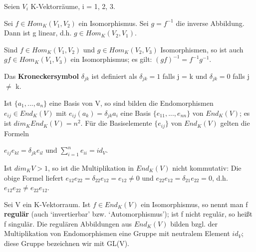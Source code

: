\begin{lemma}
Seien $V_i$ K-Vektorräume, i = 1, 2, 3.
\begin{compactenum}
\item Sei $f \in Hom_K(V_1,V_2)$ ein Isomorphismus. Sei $g = f^{-1}$ die inverse Abbildung. Dann ist g linear, d.h. $g \in Hom_K(V_2,V_1)$.
\item Sind $f \in Hom_K(V_1,V_2)$ und $g \in Hom_K(V_2,V_3)$ Isomorphismen, so ist auch $gf \in Hom_K(V_1,V_3)$ ein Isomorphismus; es gilt: $(gf)^{-1} = f^{-1}g^{-1}$.
\end{compactenum}
\end{lemma}

\begin{definition}
Das \textbf{Kroneckersymbol} $\delta_{jk}$ ist definiert als $\delta_{jk} = 1$ falls j = k und $\delta_{jk} = 0$ falls j $\neq$ k.
\end{definition}

Ist $\{a_1,... ,a_n\}$ eine Basis von V, so sind bilden die Endomorphismen $e_{ij} \in End_K (V)$ mit $e_{ij}(a_k) = \delta_{jk}a_i$ eine Basis $\{e_{11}, ..., e_{nn}\}$ von $End_K (V)$; es ist $dim_K End_K (V) = n^2$. Für die Basiselemente $\{e_{ij}\}$ von $End_K(V)$ gelten die Formeln
\begin{center}
$e_{ij}e_{kl} = \delta_{jk}e_{il}$ und $\sum\nolimits_{i=1}^{n}e_{ii} = id_V$.
\end{center}
Ist $dim_K V > 1$, so ist die Multiplikation in $End_K (V)$ nicht kommutativ: Die obige Formel liefert $e_{12}e_{22} = \delta_{22}e_{12} = e_{12} \neq 0$ und $e_{22}e_{12} = \delta_{21}e_{22} = 0$, d.h. $e_{12}e_{22} \neq e_{22}e_{12}$.

\begin{definition}
Sei V ein K-Vektorraum. Ist $f \in End_K(V)$ ein Isomorphismus, so nennt man f \textbf{regulär} (auch ‘invertierbar’ bzw. ‘Automorphismus’); ist f nicht regulär, so heißt f singulär. Die regulären Abbildungen aus $End_K (V)$ bilden bzgl. der Multiplikation von Endomorphismen eine Gruppe mit neutralem Element $id_V$; diese Gruppe bezeichnen wir mit GL(V).
\end{definition}

